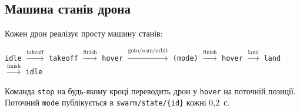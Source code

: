\subsection{Машина станів дрона}

Кожен дрон реалізує просту машину станів:

\begin{center}
\texttt{idle} $\xrightarrow{\text{takeoff}}$ \texttt{takeoff} $\xrightarrow{\text{finish}}$ \texttt{hover}
$\xrightarrow{\text{goto/scan/orbit}}$ \texttt{(mode)} $\xrightarrow{\text{finish}}$ \texttt{hover}
$\xrightarrow{\text{land}}$ \texttt{land} $\xrightarrow{\text{finish}}$ \texttt{idle}
\end{center}

Команда \texttt{stop} на будь-якому кроці переводить дрон у \texttt{hover} на поточній позиції.
Поточний \texttt{mode} публікується в \texttt{swarm/state/\{id\}} кожні 0,2~с.
